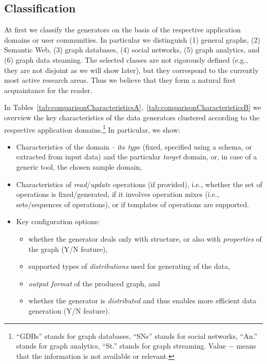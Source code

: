 %

\subsection{Classification}

At first we classify the generators on the basis of the respective application domains or user communities. In particular we distinguish (1) general graphs, (2) Semantic Web, (3) graph databases, (4) social networks, (5) graph analytics, and (6) graph data steaming. The selected classes are not rigorously defined (e.g., they are not disjoint as we will show later), but they correspond to the currently most active research areas. Thus we believe that they form a natural first acquaintance for the reader.

In Tables~\ref{tab:comparisonCharacteristicsA},~\ref{tab:comparisonCharacteristicsB}   we overview the key characteristics of the data generators clustered according to the respective application domains.\footnote{``GDBs'' stands for graph databases, ``SNs'' stands for social networks, ``An.'' stands for graph analytics, ``St.'' stands for graph streaming. Value $-$ means that the information is not available or relevant.} In particular, we show:

\begin{itemize}
\item Characteristics of the domain -- its \textit{type} (fixed, specified using a schema, or extracted from input data) and the particular \textit{target} domain, or, in case of a generic tool, the chosen sample domain,
\item Characteristics of \textit{read}/\textit{update} operations (if provided), i.e., whether the set of operations is fixed/generated, if it involves operation mixes (i.e., sets/sequences of operations), or if templates of operations are supported.
\item Key configuration options:
  \begin{itemize}
    \item whether the generator deals only with structure, or also with \textit{properties} of the graph (Y/N feature),
    \item supported types of \textit{distributions} used for generating of the data,
    \item \textit{output format} of the produced graph, and
    \item  whether the generator is \textit{distributed} and thus enables more efficient data generation (Y/N feature).
  \end{itemize}
\end{itemize}




